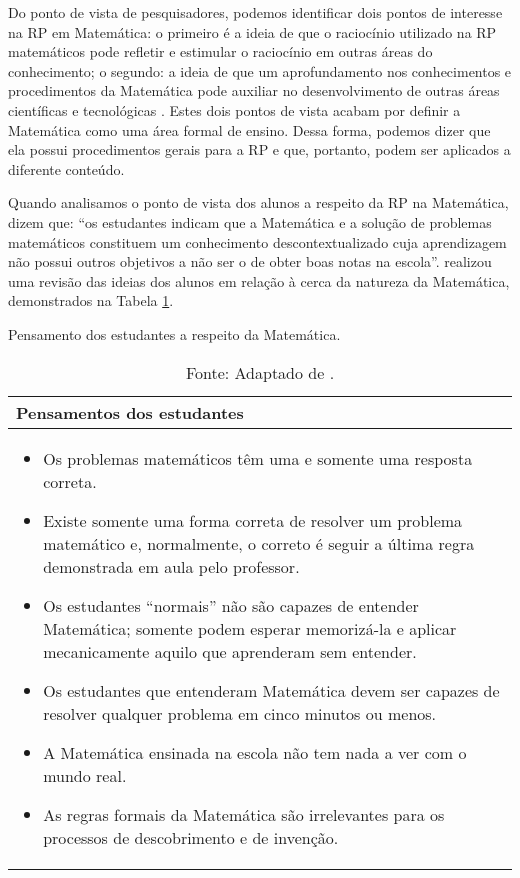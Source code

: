 Do ponto de vista de pesquisadores, podemos identificar dois pontos de interesse na RP em Matemática: o primeiro é a ideia de que o raciocínio utilizado na RP matemáticos pode refletir e estimular o raciocínio em outras áreas do conhecimento; o segundo: a ideia de que um aprofundamento nos conhecimentos e procedimentos da Matemática pode auxiliar no desenvolvimento de outras áreas científicas e tecnológicas \cite{Echeverria1998}. Estes dois pontos de vista acabam por definir a Matemática como uma área formal de ensino. Dessa forma, podemos dizer que ela possui procedimentos gerais para a RP e que, portanto, podem ser aplicados a diferente conteúdo. 

Quando analisamos o ponto de vista dos alunos a respeito da RP na Matemática,  dizem que: “os estudantes indicam que a Matemática e a solução de problemas matemáticos constituem um conhecimento descontextualizado cuja aprendizagem não possui outros objetivos a não ser o de obter boas notas na escola”.  realizou uma revisão das ideias dos alunos em relação à cerca da natureza da Matemática, demonstrados na Tabela \ref{tab:pensamento_matematica}. 

\begin{table}[ht]
\caption{Pensamento dos estudantes a respeito da Matemática.}
\label{tab:pensamento_matematica}
\begin{tabularx}{\textwidth}{@{}X@{}}
\toprule
\textbf{Pensamentos dos estudantes} \\
\midrule
\begin{itemize}
    \item Os problemas matemáticos têm uma e somente uma resposta correta.
    \item Existe somente uma forma correta de resolver um problema matemático e, normalmente, o correto é seguir a última regra demonstrada em aula pelo professor.
    \item Os estudantes “normais” não são capazes de entender Matemática; somente podem esperar memorizá-la e aplicar mecanicamente aquilo que aprenderam sem entender.
    \item Os estudantes que entenderam Matemática devem ser capazes de resolver qualquer problema em cinco minutos ou menos.
    \item A Matemática ensinada na escola não tem nada a ver com o mundo real.
    \item As regras formais da Matemática são irrelevantes para os processos de descobrimento e de invenção.
\end{itemize} \\
\bottomrule
\end{tabularx}
\caption*{Fonte: Adaptado de \cite{Schoenfeld1992,Echeverria1998}.}
\end{table}

